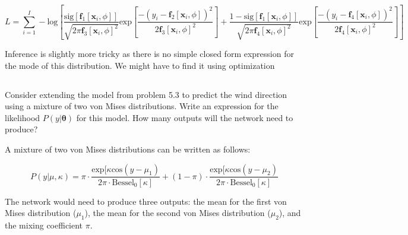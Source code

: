 \documentclass[12pt]{report}
\begin{document}
\begin{equation*}
    L = \sum^{I}_{i=1} - \text{log}\left[\frac{\text{sig}[\mathbf{f}_{1}[\mathbf{x}_{i}, \phi]]}{\sqrt{2\pi\mathbf{f}_{3}[\mathbf{x}_{i}, \phi]^{2}}}\text{exp}\left[\frac{-(y_{i}-\mathbf{f}_{2}[\mathbf{x}_{i}, \phi])^{2}}{2\mathbf{f}_{3}[\mathbf{x}_{i}, \phi]^{2}}\right] + \frac{1-\text{sig}[\mathbf{f}_{1}[\mathbf{x}_{i}, \phi]]}{\sqrt{2\pi\mathbf{f}_{4}[\mathbf{x}_{i}, \phi]^{2}}}\text{exp}\left[\frac{-(y_{i}-\mathbf{f}_{4}[\mathbf{x}_{i}, \phi])^{2}}{2\mathbf{f}_{4}[\mathbf{x}_{i}, \phi]^{2}}\right]\right]
\end{equation*}

Inference is slightly more tricky as there is no simple closed form expression for the mode of this distribution. We might have to find it using optimization

\subsection{}
\begin{mdframed}
    Consider extending the model from problem 5.3 to predict the wind direction using a mixture of two von Mises distributions. Write an expression for the likelihood $P(y|\boldsymbol{\theta})$ for this model. How many outputs will the network need to produce?
\end{mdframed}

A mixture of two von Mises distributions can be written as follows:

\begin{equation*}
    P(y|\mu,\kappa) = \pi \cdot\frac{\text{exp}[\kappa\text{cos}(y-\mu_{1})}{2\pi \cdot \text{Bessel}_{0}[\kappa]} + (1-\pi)\cdot\frac{\text{exp}[\kappa\text{cos}(y-\mu_{2})}{2\pi \cdot \text{Bessel}_{0}[\kappa]}
\end{equation*}

The network would need to produce three outputs: the mean for the first von Mises distribution ($\mu_{1}$), the mean for the second von Mises distribution ($\mu_{2}$), and the mixing coefficient $\pi$.
\end{document}
